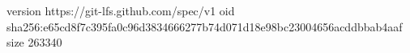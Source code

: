 version https://git-lfs.github.com/spec/v1
oid sha256:e65cd8f7c395fa0c96d3834666277b74d071d18e98bc23004656acddbbab4aaf
size 263340
